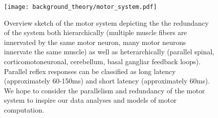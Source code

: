 \documentclass[../main.tex]{subfiles}
\begin{document}
\begin{figure}[H]
\centering
\texttt{[image: background\_theory/motor\_system.pdf]}
\caption[Motor sytem schematic]{Overview sketch of the motor system depicting the the redundancy of the system both hierarchically (multiple muscle fibers are innervated by the same motor neuron, many motor neurons innervate the same muscle) as well as heterarchically (parallel spinal, corticomotoneuronal, cerebellum, basal gangliar feedback loops). Parallel reflex responses can be classified as long latency (approximately 60-150ms) and short latency (approximately 60ms). We hope to consider the parallelism and redundancy of the motor system to inspire our data analyses and models of motor computation.}\label{fig:motor_system}
\end{figure}


  





\end{document}
